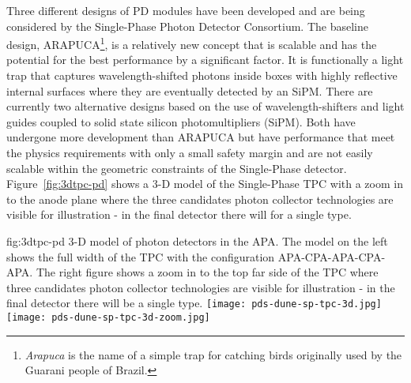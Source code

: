 Three different designs of PD modules have been developed and are being considered by the Single-Phase Photon Detector Consortium. The baseline design, ARAPUCA\footnote{{\it Arapuca} is the name of a simple trap for catching birds originally used by the Guarani people of Brazil.}, is a relatively new concept that is scalable and has the potential for the best performance by a significant factor. It is functionally a light trap that captures wavelength-shifted photons inside boxes with highly reflective internal surfaces where they are eventually detected by an SiPM.  There are currently two alternative designs based on the use of wavelength-shifters and light guides coupled to solid state silicon photomultipliers (SiPM). Both have undergone more development than ARAPUCA but have performance that meet the physics requirements with only a small safety margin and are not easily scalable within the geometric constraints of the Single-Phase detector.
Figure~\ref{fig:3dtpc-pd} shows a 3-D model of the Single-Phase TPC with a zoom in to the anode plane where the three candidates photon collector technologies are visible for illustration - in the final detector there will for a single type.

\begin{dunefigure}{fig:3dtpc-pd}
{3-D model of photon detectors in the APA. The model on the left shows the full width of the TPC with the configuration APA-CPA-APA-CPA-APA. The right figure shows a zoom in to the top far side of the TPC where three candidates photon collector technologies are visible for illustration - in the final detector there will be a single type.}
\texttt{[image: pds-dune-sp-tpc-3d.jpg]}
\texttt{[image: pds-dune-sp-tpc-3d-zoom.jpg]}
\end{dunefigure}



